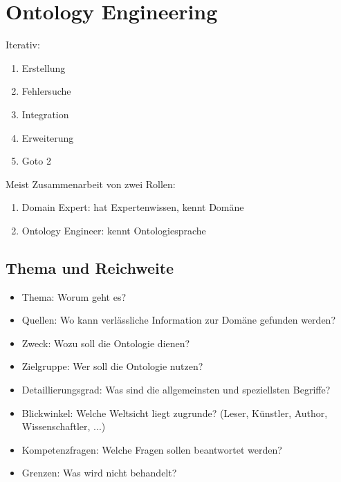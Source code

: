 \documentclass[a4paper]{article}
\title{\docTitle}
\author{Moritz}
\date{\today}
\begin{document}
\maketitle
\tableofcontents


\section{Ontology Engineering}

Iterativ:

\begin{enumerate}
    \item Erstellung
    \item Fehlersuche
    \item Integration
    \item Erweiterung
    \item Goto 2
\end{enumerate}

Meist Zusammenarbeit von zwei Rollen:

\begin{enumerate}
    \item Domain Expert: hat Expertenwissen, kennt Domäne
    \item Ontology Engineer: kennt Ontologiesprache
\end{enumerate}

\subsection{Thema und Reichweite}

\begin{itemize}
    \item Thema: Worum geht es?
    \item Quellen: Wo kann verlässliche Information zur Domäne gefunden werden?
    \item Zweck: Wozu soll die Ontologie dienen?
    \item Zielgruppe: Wer soll die Ontologie nutzen?
    \item Detaillierungsgrad: Was sind die allgemeinsten und speziellsten Begriffe?
    \item Blickwinkel: Welche Weltsicht liegt zugrunde? (Leser, Künstler, Author, Wissenschaftler, ...)
    \item Kompetenzfragen: Welche Fragen sollen beantwortet werden?
    \item Grenzen: Was wird nicht behandelt?
\end{itemize}
\end{document}
